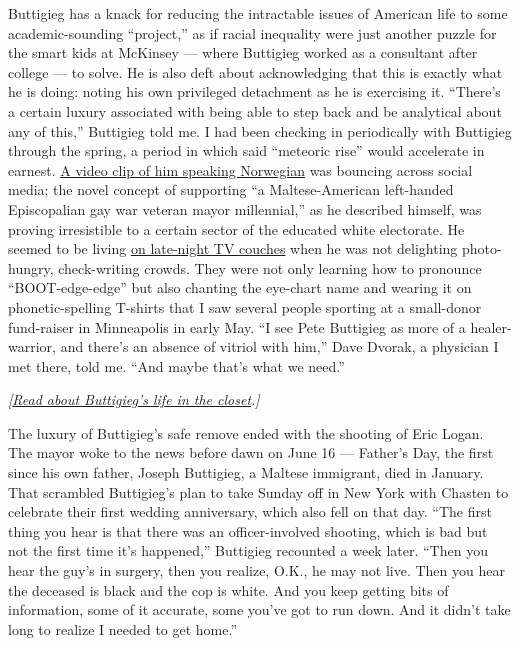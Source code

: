Buttigieg has a knack for reducing the intractable issues of American
life to some academic-sounding ``project,'' as if racial inequality were
just another puzzle for the smart kids at McKinsey --- where Buttigieg
worked as a consultant after college --- to solve. He is also deft about
acknowledging that this is exactly what he is doing: noting his own
privileged detachment as he is exercising it. ``There's a certain luxury
associated with being able to step back and be analytical about any of
this,'' Buttigieg told me. I had been checking in periodically with
Buttigieg through the spring, a period in which said ``meteoric rise''
would accelerate in earnest.
\href{https://www.nytimes3xbfgragh.onion/2019/04/24/magazine/pete-buttigieg-smart-harvard-rhodes-scholar-norwegian-language.html}{A
video clip of him speaking Norwegian} was bouncing across social media;
the novel concept of supporting ``a Maltese-American left-handed
Episcopalian gay war veteran mayor millennial,'' as he described
himself, was proving irresistible to a certain sector of the educated
white electorate. He seemed to be living
\href{https://www.youtube.com/watch?v=u7SHQSGesyM}{on late-night TV
couches} when he was not delighting photo-hungry, check-writing crowds.
They were not only learning how to pronounce ``BOOT-edge-edge'' but also
chanting the eye-chart name and wearing it on phonetic-spelling T-shirts
that I saw several people sporting at a small-donor fund-raiser in
Minneapolis in early May. ``I see Pete Buttigieg as more of a
healer-warrior, and there's an absence of vitriol with him,'' Dave
Dvorak, a physician I met there, told me. ``And maybe that's what we
need.''

\emph{{[}}\href{https://www.nytimes3xbfgragh.onion/2019/07/14/us/politics/pete-buttigieg-gay.html}{\emph{Read
about Buttigieg's life in the closet}}\emph{.{]}}

The luxury of Buttigieg's safe remove ended with the shooting of Eric
Logan. The mayor woke to the news before dawn on June 16 --- Father's
Day, the first since his own father, Joseph Buttigieg, a Maltese
immigrant, died in January. That scrambled Buttigieg's plan to take
Sunday off in New York with Chasten to celebrate their first wedding
anniversary, which also fell on that day. ``The first thing you hear is
that there was an officer-involved shooting, which is bad but not the
first time it's happened,'' Buttigieg recounted a week later. ``Then you
hear the guy's in surgery, then you realize, O.K., he may not live. Then
you hear the deceased is black and the cop is white. And you keep
getting bits of information, some of it accurate, some you've got to run
down. And it didn't take long to realize I needed to get home.''

